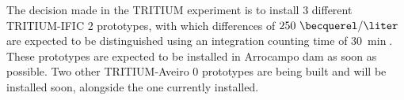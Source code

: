 The decision made in the TRITIUM experiment is to install 3 different TRITIUM-IFIC 2 prototypes, with which differences of $250~\becquerel/\liter$ are expected to be distinguished using an integration counting time of $30~\min$. These prototypes are expected to be installed  in Arrocampo dam as soon as possible. Two other TRITIUM-Aveiro 0 prototypes are being built and will be installed soon, alongside the one currently installed.





